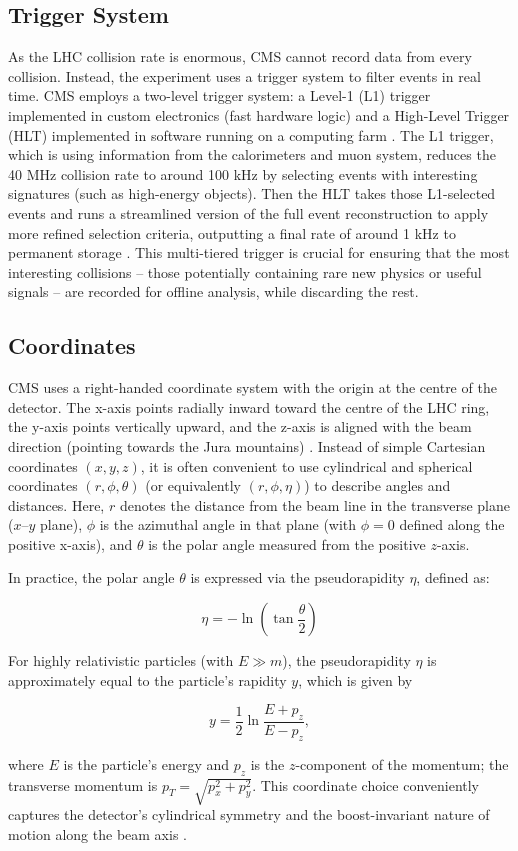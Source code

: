 \subsection{Trigger System}
As the LHC collision rate is enormous, CMS cannot record data from every collision. Instead, the experiment uses a trigger system to filter events in real time. CMS employs a two-level trigger system: a Level-1 (L1) trigger implemented in custom electronics (fast hardware logic) and a High-Level Trigger (HLT) implemented in software running on a computing farm \cite{Khachatryan_2017}. The L1 trigger, which is using information from the calorimeters and muon system, reduces the 40 MHz collision rate to around 100 kHz by selecting events with interesting signatures (such as high-energy objects). Then the HLT takes those L1-selected events and runs a streamlined version of the full event reconstruction to apply more refined selection criteria, outputting a final rate of around 1 kHz to permanent storage \cite{Khachatryan_2017}. This multi-tiered trigger is crucial for ensuring that the most interesting collisions – those potentially containing rare new physics or useful signals – are recorded for offline analysis, while discarding the rest.

\subsection{Coordinates}
CMS uses a right-handed coordinate system with the origin at the centre of the detector. The x-axis points radially inward toward the centre of the LHC ring, the y-axis points vertically upward, and the z-axis is aligned with the beam direction (pointing towards the Jura mountains) \cite{Chatrychan_2008}. Instead of simple Cartesian coordinates $(x,y,z)$, it is often convenient to use cylindrical and spherical coordinates $(r,\phi,\theta)$ (or equivalently $(r,\phi,\eta)$) to describe angles and distances. Here, $r$ denotes the distance from the beam line in the transverse plane ($x$–$y$ plane), $\phi$ is the azimuthal angle in that plane (with $\phi=0$ defined along the positive x-axis), and $\theta$ is the polar angle measured from the positive $z$-axis.

In practice, the polar angle $\theta$ is expressed via the pseudorapidity $\eta$, defined as:

\begin{equation}
    \eta = - \ln \left( \tan \frac{\theta}{2}\right)
\end{equation}

For highly relativistic particles (with $E \gg m$), the pseudorapidity $\eta$ is approximately equal to the particle’s rapidity $y$, which is given by

\begin{equation}
    y = \frac{1}{2} \ln\frac{E+p_z}{E-p_z},
\end{equation}

where $E$ is the particle’s energy and $p_z$ is the $z$-component of the momentum; the transverse momentum is $p_T=\sqrt{p_x^2+p_y^2}$. This coordinate choice conveniently captures the detector’s cylindrical symmetry and the boost-invariant nature of motion along the beam axis \cite{Chatrychan_2008}.